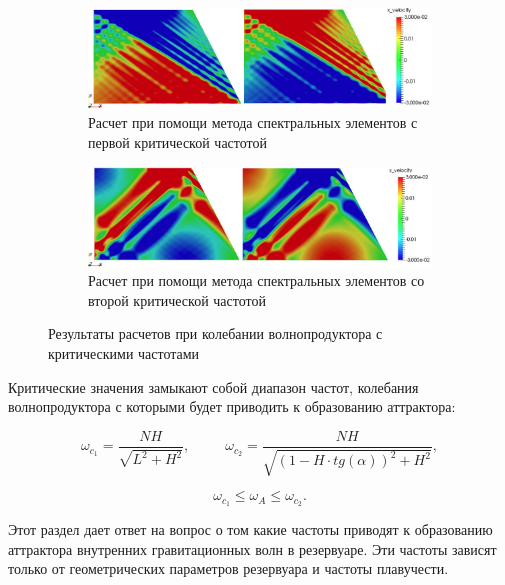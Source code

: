 \begin{figure}
    \centering
    
    \begin{subfigure}[с]{1\textwidth}
        \includegraphics[scale=0.45]{Figs/AttrNEKcrit1.png}
        \caption{Расчет при помощи метода спектральных элементов с первой критической частотой}
    \end{subfigure}
    
    \begin{subfigure}[r]{1\textwidth}
        \includegraphics[scale=0.45]{Figs/AttrNekCrit2.png}
        \caption{Расчет при помощи метода спектральных элементов со второй критической частотой}
    \end{subfigure}
    \caption{Результаты расчетов при колебании волнопродуктора с критическими частотами}
    \label{fig:critNekfr}
\end{figure}

Критические значения замыкают собой диапазон частот, колебания волнопродуктора с которыми будет приводить к образованию аттрактора:

\begin{equation}
    \omega_{c_{1}}=\frac{NH}{\sqrt{L^2+H^2}}, \;\;\;\;\;\;\;\;\; \omega_{c_{2}} = \frac{NH}{\sqrt{\left( 1-H\cdot tg(\alpha) \right)^2+H^2}},
\end{equation}


\begin{equation}
    \omega_{c_{1}} \leq \omega_A \leq \omega_{c_{2}}.
\end{equation}

Этот раздел дает ответ на вопрос о том какие частоты приводят к образованию аттрактора внутренних гравитационных волн в резервуаре. Эти частоты зависят только от геометрических параметров резервуара и частоты плавучести.

